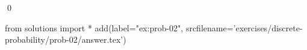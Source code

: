 
\begin{ex} 
  \label{ex:prob-02}
  
  \qed
\end{ex} 
\begin{python0}
from solutions import *
add(label="ex:prob-02",
    srcfilename='exercises/discrete-probability/prob-02/answer.tex') 
\end{python0}
